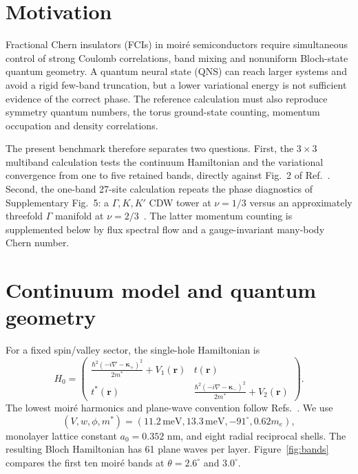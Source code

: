 \documentclass[10pt,twocolumn]{article}
\begin{document}
\section{Motivation}

Fractional Chern insulators (FCIs) in moir\'e semiconductors require simultaneous control of strong Coulomb correlations, band mixing and nonuniform Bloch-state quantum geometry.  A quantum neural state (QNS) can reach larger systems and avoid a rigid few-band truncation, but a lower variational energy is not sufficient evidence of the correct phase.  The reference calculation must also reproduce symmetry quantum numbers, the torus ground-state counting, momentum occupation and density correlations.

The present benchmark therefore separates two questions.  First, the $3\times3$ multiband calculation tests the continuum Hamiltonian and the variational convergence from one to five retained bands, directly against Fig.~2 of Ref.~\cite{luo}.  Second, the one-band 27-site calculation repeats the phase diagnostics of Supplementary Fig.~5: a $\Gamma,K,K'$ CDW tower at $\nu=1/3$ versus an approximately threefold $\Gamma$ manifold at $\nu=2/3$~\cite{luo}.  The latter momentum counting is supplemented below by flux spectral flow and a gauge-invariant many-body Chern number.

\section{Continuum model and quantum geometry}

For a fixed spin/valley sector, the single-hole Hamiltonian is
\begin{equation}
H_0=\begin{pmatrix}
\frac{\hbar^2(-i\nabla-\bm\kappa_+)^2}{2m^*}+V_1(\bm r)&t(\bm r)\\
t^*(\bm r)&\frac{\hbar^2(-i\nabla-\bm\kappa_-)^2}{2m^*}+V_2(\bm r)
\end{pmatrix}.
\end{equation}
The lowest moir\'e harmonics and plane-wave convention follow Refs.~\cite{reddy,luo}.  We use
\begin{equation}
(V,w,\phi,m^*)=(11.2\,\mathrm{meV},13.3\,\mathrm{meV},-91^\circ,0.62m_e),
\end{equation}
monolayer lattice constant $a_0=0.352$ nm, and eight radial reciprocal shells.  The resulting Bloch Hamiltonian has 61 plane waves per layer.  Figure~\ref{fig:bands} compares the first ten moir\'e bands at $\theta=2.6^\circ$ and $3.0^\circ$.
\end{document}
